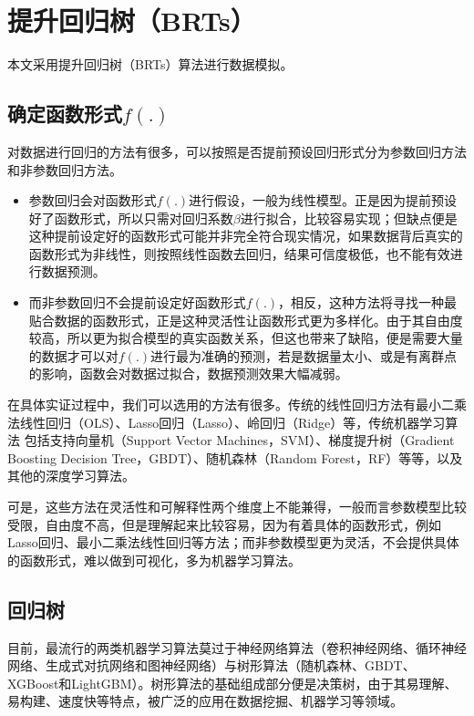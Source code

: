 
\chapter{提升回归树（BRTs）}
本文采用提升回归树（BRTs）算法进行数据模拟\cite{elithWorkingGuideBoosted2008}。

\section{确定函数形式$f(.)$}
对数据进行回归的方法有很多，可以按照是否提前预设回归形式分为参数回归方法和非参数回归方法。
\begin{itemize}

\item 参数回归会对函数形式$f(.)$进行假设，一般为线性模型。正是因为提前预设好了函数形式，所以只需对回归系数$\beta$进行拟合，比较容易实现；但缺点便是这种提前设定好的函数形式可能并非完全符合现实情况，如果数据背后真实的函数形式为非线性，则按照线性函数去回归，结果可信度极低，也不能有效进行数据预测。

\item 而非参数回归不会提前设定好函数形式$f(.)$，相反，这种方法将寻找一种最贴合数据的函数形式，正是这种灵活性让函数形式更为多样化。由于其自由度较高，所以更为拟合模型的真实函数关系，但这也带来了缺陷，便是需要大量的数据才可以对$f(.)$进行最为准确的预测，若是数据量太小、或是有离群点的影响，函数会对数据过拟合，数据预测效果大幅减弱。
\end{itemize}

在具体实证过程中，我们可以选用的方法有很多。传统的线性回归方法有最小二乘法线性回归（OLS）、Lasso回归（Lasso）、岭回归（Ridge）等，传统机器学习算法 包括支持向量机（Support Vector Machines，SVM）、梯度提升树（Gradient Boosting Decision Tree，GBDT）、随机森林（Random Forest，RF）等等，以及其他的深度学习算法。

可是，这些方法在灵活性和可解释性两个维度上不能兼得，一般而言参数模型比较受限，自由度不高，但是理解起来比较容易，因为有着具体的函数形式，例如Lasso回归、最小二乘法线性回归等方法；而非参数模型更为灵活，不会提供具体的函数形式，难以做到可视化，多为机器学习算法。

\section{回归树}
目前，最流行的两类机器学习算法莫过于神经网络算法（卷积神经网络、循环神经网络、生成式对抗网络和图神经网络）与树形算法（随机森林、GBDT、XGBoost和LightGBM）\cite{microstrongRegressionTreeHuiGuiShu2019}。树形算法的基础组成部分便是决策树，由于其易理解、易构建、速度快等特点，被广泛的应用在数据挖掘、机器学习等领域。

